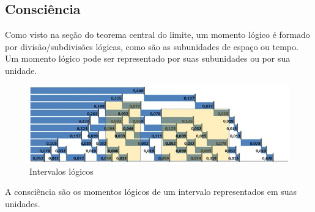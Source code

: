 \subsection{Consciência}
Como visto na seção do teorema central do limite, um momento lógico é formado por divisão/subdivisões lógicas, como são as subunidades de espaço ou tempo. Um momento lógico pode ser representado por suas subunidades ou por sua unidade.

\begin{figure}[H]
\caption{Intervalos lógicos}
\label{fig:2_consciousnesses_in_all_unconscious}
\centering
\includegraphics[scale=1]{sections/images/2_consciousnesses_in_all_unconscious.jpg}
\end{figure}

A consciência são os momentos lógicos de um intervalo representados em suas unidades.


